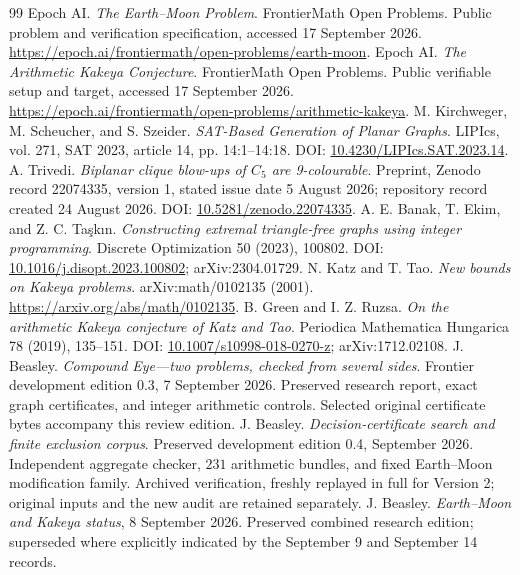 \documentclass[11pt,letterpaper]{article}
\theoremstyle{definition}
\theoremstyle{remark}\newtheorem{remark}[theorem]{Remark}
\begin{document}
\begin{thebibliography}{99}
 Epoch AI. \emph{The Earth--Moon Problem}. FrontierMath Open Problems. Public problem and verification specification, accessed 17 September 2026. \url{https://epoch.ai/frontiermath/open-problems/earth-moon}.
 Epoch AI. \emph{The Arithmetic Kakeya Conjecture}. FrontierMath Open Problems. Public verifiable setup and target, accessed 17 September 2026. \url{https://epoch.ai/frontiermath/open-problems/arithmetic-kakeya}.
 M. Kirchweger, M. Scheucher, and S. Szeider. \emph{SAT-Based Generation of Planar Graphs}. LIPIcs, vol. 271, SAT 2023, article 14, pp. 14:1--14:18. DOI: \href{https://doi.org/10.4230/LIPIcs.SAT.2023.14}{10.4230/LIPIcs.SAT.2023.14}.
 A. Trivedi. \emph{Biplanar clique blow-ups of $C_5$ are 9-colourable}. Preprint, Zenodo record 22074335, version 1, stated issue date 5 August 2026; repository record created 24 August 2026. DOI: \href{https://doi.org/10.5281/zenodo.22074335}{10.5281/zenodo.22074335}.
 A. E. Banak, T. Ekim, and Z. C. Ta\c{s}k\i n. \emph{Constructing extremal triangle-free graphs using integer programming}. Discrete Optimization 50 (2023), 100802. DOI: \href{https://doi.org/10.1016/j.disopt.2023.100802}{10.1016/j.disopt.2023.100802}; arXiv:2304.01729.
 N. Katz and T. Tao. \emph{New bounds on Kakeya problems}. arXiv:math/0102135 (2001). \url{https://arxiv.org/abs/math/0102135}.
 B. Green and I. Z. Ruzsa. \emph{On the arithmetic Kakeya conjecture of Katz and Tao}. Periodica Mathematica Hungarica 78 (2019), 135--151. DOI: \href{https://doi.org/10.1007/s10998-018-0270-z}{10.1007/s10998-018-0270-z}; arXiv:1712.02108.
 J. Beasley. \emph{Compound Eye---two problems, checked from several sides}. Frontier development edition 0.3, 7 September 2026. Preserved research report, exact graph certificates, and integer arithmetic controls. Selected original certificate bytes accompany this review edition.
 J. Beasley. \emph{Decision-certificate search and finite exclusion corpus}. Preserved development edition 0.4, September 2026. Independent aggregate checker, $231$ arithmetic bundles, and fixed Earth--Moon modification family. Archived verification, freshly replayed in full for Version 2; original inputs and the new audit are retained separately.
 J. Beasley. \emph{Earth--Moon and Kakeya status}, 8 September 2026. Preserved combined research edition; superseded where explicitly indicated by the September 9 and September 14 records.

\end{thebibliography}
\end{document}
